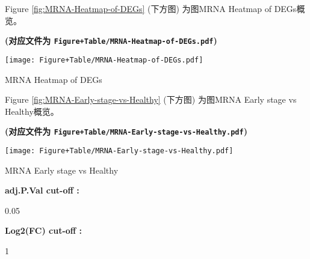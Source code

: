 \documentclass[
]{article}
\begin{document}
\begin{center}\vspace{1.5cm}\end{center}

Figure \ref{fig:MRNA-Heatmap-of-DEGs} (下方图) 为图MRNA Heatmap of DEGs概览。

\textbf{(对应文件为 \texttt{Figure+Table/MRNA-Heatmap-of-DEGs.pdf})}

\def\@captype{figure}
\begin{center}
\texttt{[image: Figure+Table/MRNA-Heatmap-of-DEGs.pdf]}
\caption{MRNA Heatmap of DEGs}\label{fig:MRNA-Heatmap-of-DEGs}
\end{center}

\begin{center}\vspace{1.5cm}\end{center}

\begin{center}\vspace{1.5cm}\end{center}

Figure \ref{fig:MRNA-Early-stage-vs-Healthy} (下方图) 为图MRNA Early stage vs Healthy概览。

\textbf{(对应文件为 \texttt{Figure+Table/MRNA-Early-stage-vs-Healthy.pdf})}

\def\@captype{figure}
\begin{center}
\texttt{[image: Figure+Table/MRNA-Early-stage-vs-Healthy.pdf]}
\caption{MRNA Early stage vs Healthy}\label{fig:MRNA-Early-stage-vs-Healthy}
\end{center}

\begin{center}\vspace{1.5cm}\end{center}\begin{center}\begin{tcolorbox}[colback=gray!10, colframe=gray!50, width=0.9\linewidth, arc=1mm, boxrule=0.5pt]
\textbf{
adj.P.Val cut-off
:}

\vspace{0.5em}

    0.05

\vspace{2em}


\textbf{
Log2(FC) cut-off
:}

\vspace{0.5em}

    1

\vspace{2em}
\end{tcolorbox}
\end{center}
\end{document}

